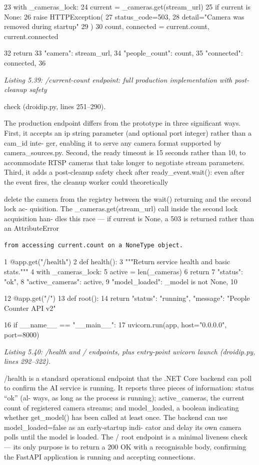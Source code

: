 23 with \_cameras\_lock:
24 current = \_cameras.get(stream\_url)
25 if current is None:
26 raise HTTPException(
27 status\_code=503,
28 detail="Camera was removed during startup"
29 )
30 count, connected = current.count, current.connected

32 return {
33 "camera": stream\_url,
34 "people\_count": count,
35 "connected": connected,
36 }


\textit{Listing 5.39: /current-count endpoint: full production implementation with post-cleanup safety}

check (droidip.py, lines 251--290).


The production endpoint differs from the prototype in three signiﬁcant ways. First,
it accepts an ip string parameter (and optional port integer) rather than a cam\_id inte-
ger, enabling it to serve any camera format supported by camera\_sources.py. Second,
the ready timeout is 15 seconds rather than 10, to accommodate RTSP cameras that take
longer to negotiate stream parameters. Third, it adds a post-cleanup safety check after
ready\_event.wait(): even after the event ﬁres, the cleanup worker could theoretically



delete the camera from the registry between the wait() returning and the second lock ac-
quisition. The \_cameras.get(stream\_url) call inside the second lock acquisition han-
dles this race --- if current is None, a 503 is returned rather than an AttributeError
\begin{lstlisting}
from accessing current.count on a NoneType object.
\end{lstlisting}

1 @app.get("/health")
2 def health():
3 """Return service health and basic stats."""
4 with \_cameras\_lock:
5 active = len(\_cameras)
6 return {
7 "status": "ok",
8 "active\_cameras": active,
9 "model\_loaded": \_model is not None,
10 }

12 @app.get("/")
13 def root():
14 return {"status": "running", "message": "People Counter API v2"}

16 if \_\_name\_\_ == "\_\_main\_\_":
17 uvicorn.run(app, host="0.0.0.0", port=8000)



\textit{Listing 5.40: /health and / endpoints, plus entry-point uvicorn launch (droidip.py, lines 292--322).}



/health is a standard operational endpoint that the .NET Core backend can poll to
conﬁrm the AI service is running. It reports three pieces of information: status ``ok'' (al-
ways, as long as the process is running); active\_cameras, the current count of registered
camera streams; and model\_loaded, a boolean indicating whether get\_model() has been
called at least once. The backend can use model\_loaded=false as an early-startup indi-
cator and delay its own camera polls until the model is loaded. The / root endpoint is a
minimal liveness check --- its only purpose is to return a 200 OK with a recognisable body,
conﬁrming the FastAPI application is running and accepting connections.

